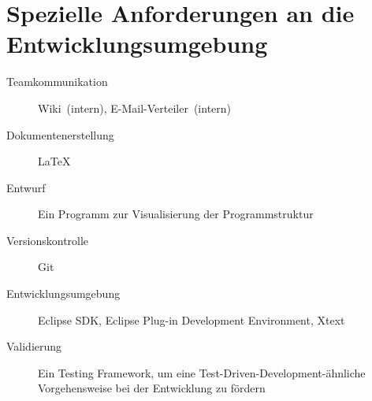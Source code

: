 \section{Spezielle Anforderungen an die Entwicklungsumgebung}%

\begin{description}%
    \item [Teamkommunikation] Wiki~(intern), E-Mail-Verteiler~(intern)
    \item [Dokumentenerstellung] \see \LaTeX{}%
    \item [Entwurf] Ein Programm zur Visualisierung der Programmstruktur
    \item [Versionskontrolle] \see Git%
    \item [Entwicklungsumgebung] \see Eclipse SDK, \see Eclipse Plug-in Development Environment, \see Xtext%
    \item [Validierung] Ein Testing Framework, um eine Test-Driven-Development-ähnliche Vorgehensweise bei der Entwicklung zu fördern
\end{description}%
